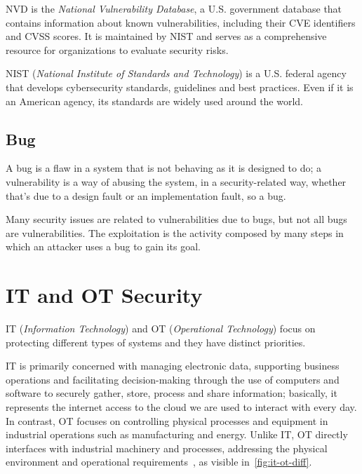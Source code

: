 
NVD is the \textit{National Vulnerability Database}, a U.S. government database that contains information about known vulnerabilities, including their CVE identifiers and CVSS scores. It is maintained by NIST and serves as a comprehensive resource for organizations to evaluate security risks.

NIST (\textit{National Institute of Standards and Technology}) is a U.S. federal agency that develops cybersecurity standards, guidelines and best practices. Even if it is an American agency, its standards are widely used around the world.

\subsection{Bug}

A bug is a flaw in a system that is not behaving as it is designed to do; a vulnerability is a way of abusing the system, in a security-related way, whether that's due to a design fault or an implementation fault, so a bug.

Many security issues are related to vulnerabilities due to bugs, but not all bugs are vulnerabilities. The exploitation is the activity composed by many steps in which an attacker uses a bug to gain its goal.

\section{IT and OT Security}

IT (\textit{Information Technology}) and OT (\textit{Operational Technology}) focus on protecting different types of systems and they have distinct priorities.

IT is primarily concerned with managing electronic data, supporting business operations and facilitating decision-making through the use of computers and software to securely gather, store, process and share information; basically, it represents the internet access to the cloud we are used to interact with every day. In contrast, OT focuses on controlling physical processes and equipment in industrial operations such as manufacturing and energy. Unlike IT, OT directly interfaces with industrial machinery and processes, addressing the physical environment and operational requirements~\cite{paloalto-it-ot-diff}, as visible in~\cref{fig:it-ot-diff}.

